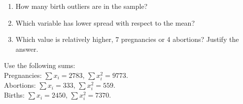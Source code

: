 \begin{enumerate}[leftmargin=*]
\begin{enumerate}
\item How many birth outliers are in the sample?
\item Which variable has lower spread with respect to the mean?
\item Which value is relatively higher, 7 pregnancies or 4 abortions? Justify the answer.
\end{enumerate}

Use the following sums:\\
Pregnancies: $\sum x_i= 2783$, $\sum x_i^2=9773$.\\
Abortions: $\sum x_i= 333$, $\sum x_i^2=559$.\\
Births: $\sum x_i= 2450$, $\sum x_i^2=7370$.

\end{enumerate}